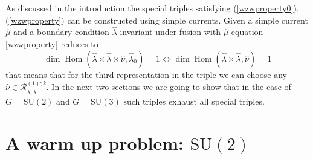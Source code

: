 \documentclass[a4paper,11pt]{article}
\theoremstyle{plain}
\theoremstyle{definition}
\newcommand{\dimh}{\operatorname{dim}\operatorname{Hom}}
\begin{document}
As discussed in the introduction the special triples satisfying (\ref{wzwproperty0}), (\ref{wzwproperty}) can be constructed using simple currents. 
Given   a simple current $\hat{\mu}$ and a boundary condition  $\hat{\lambda}$  invariant under fusion with $\hat{\mu}$
equation \eqref{wzwproperty} reduces to 
\begin{equation}\label{wzwproperty2}
     \dimh\left( \hat{\lambda}\times \overline{\hat{\lambda}} \times \hat{\nu},\hat{\lambda}_0\right)=1 \Longleftrightarrow  \dimh\left( \hat{\lambda}\times \overline{\hat{\lambda}} , \overline{\hat{\nu}} \right)=1
\end{equation}
that means that for the third representation in the triple we can choose any $\hat{\nu}\in \mathcal{R}^{(1);k}_{\lambda,\overline{\lambda}}$.
In the next two sections we are going to show that in the case of $G=\mathrm{SU(2)}$ and $G=\mathrm{SU(3)}$ such triples exhaust all special triples. %














\section{A warm up problem: $\mathrm{SU(2)}$ } \label{sec3}
\end{document}

